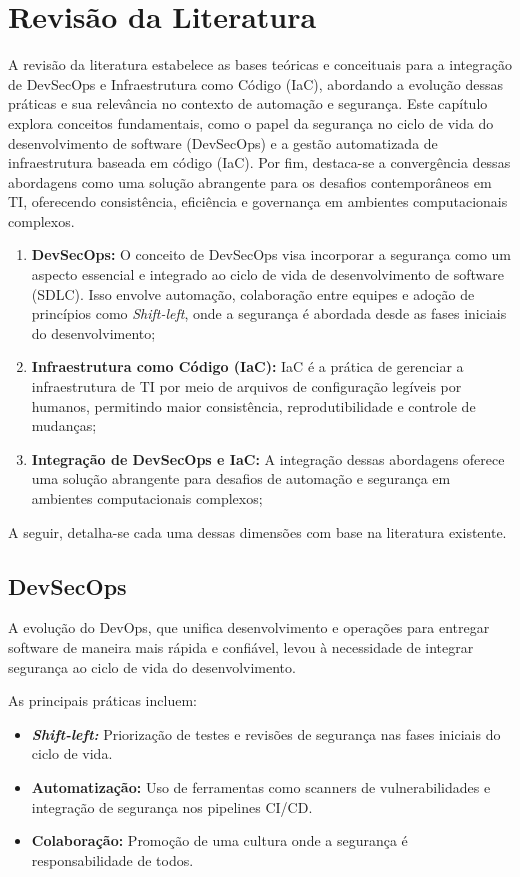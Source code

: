 \chapter{Revisão da Literatura}
A revisão da literatura estabelece as bases teóricas e conceituais para a integração de DevSecOps e Infraestrutura como Código (IaC), abordando a evolução dessas práticas e sua relevância no contexto de automação e segurança. Este capítulo explora conceitos fundamentais, como o papel da segurança no ciclo de vida do desenvolvimento de software (DevSecOps) e a gestão automatizada de infraestrutura baseada em código (IaC). Por fim, destaca-se a convergência dessas abordagens como uma solução abrangente para os desafios contemporâneos em TI, oferecendo consistência, eficiência e governança em ambientes computacionais complexos.

\begin{enumerate}
    \item\textbf{DevSecOps:} O conceito de DevSecOps visa incorporar a segurança como um aspecto essencial e integrado ao ciclo de vida de desenvolvimento de software (SDLC). Isso envolve automação, colaboração entre equipes e adoção de princípios como \textit{Shift-left}, onde a segurança é abordada desde as fases iniciais do desenvolvimento;
    \item\textbf{Infraestrutura como Código (IaC):} IaC é a prática de gerenciar a infraestrutura de TI por meio de arquivos de configuração legíveis por humanos, permitindo maior consistência, reprodutibilidade e controle de mudanças;
    \item\textbf{Integração de DevSecOps e IaC:} A integração dessas abordagens oferece uma solução abrangente para desafios de automação e segurança em ambientes computacionais complexos;
\end{enumerate}

A seguir, detalha-se cada uma dessas dimensões com base na literatura existente.



\section{DevSecOps}
A evolução do DevOps, que unifica desenvolvimento e operações para entregar software de maneira mais rápida e confiável, levou à necessidade de integrar segurança ao ciclo de vida do desenvolvimento.

As principais práticas incluem:

\begin{itemize}
    \item\textbf{\textit{Shift-left:}} Priorização de testes e revisões de segurança nas fases iniciais do ciclo de vida.
    \item\textbf{Automatização:} Uso de ferramentas como scanners de vulnerabilidades e integração de segurança nos pipelines CI/CD.
    \item\textbf{Colaboração:} Promoção de uma cultura onde a segurança é responsabilidade de todos.
\end{itemize}

